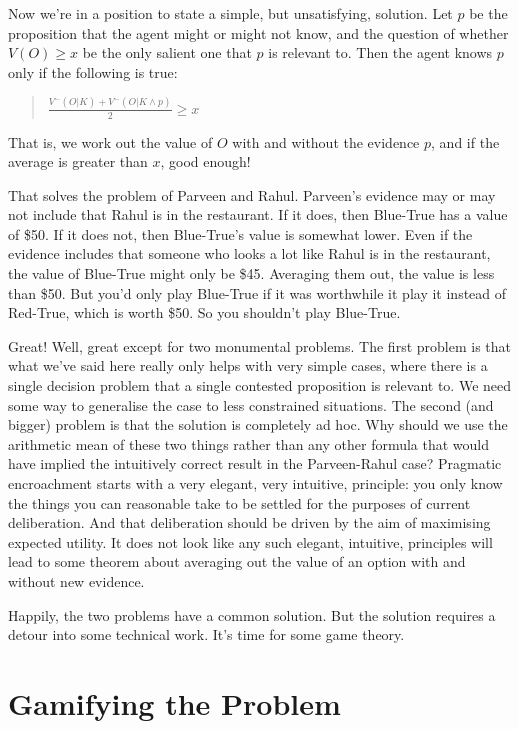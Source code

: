 Now we're in a position to state a simple, but unsatisfying, solution. Let $p$ be the proposition that the agent might or might not know, and the question of whether $V(O) \geq x$ be the only salient one that $p$ is relevant to. Then the agent knows $p$ only if the following is true:

\begin{quote}

$\frac{V^-(O | K) + V^-(O | K \wedge p)}{2} \geq x$
\end{quote}
That is, we work out the value of $O$ with and without the evidence $p$, and if the average is greater than $x$, good enough!

That solves the problem of Parveen and Rahul. Parveen's evidence may or may not include that Rahul is in the restaurant. If it does, then Blue-True has a value of \$50. If it does not, then Blue-True's value is somewhat lower. Even if the evidence includes that someone who looks a lot like Rahul is in the restaurant, the value of Blue-True might only be \$45. Averaging them out, the value is less than \$50. But you'd only play Blue-True if it was worthwhile it play it instead of Red-True, which is worth \$50. So you shouldn't play Blue-True.

Great! Well, great except for two monumental problems. The first problem is that what we've said here really only helps with very simple cases, where there is a single decision problem that a single contested proposition is relevant to. We need some way to generalise the case to less constrained situations. The second (and bigger) problem is that the solution is completely ad hoc. Why should we use the arithmetic mean of these two things rather than any other formula that would have implied the intuitively correct result in the Parveen-Rahul case? Pragmatic encroachment starts with a very elegant, very intuitive, principle: you only know the things you can reasonable take to be settled for the purposes of current deliberation. And that deliberation should be driven by the aim of maximising expected utility. It does not look like any such elegant, intuitive, principles will lead to some theorem about averaging out the value of an option with and without new evidence.

Happily, the two problems have a common solution. But the solution requires a detour into some technical work. It's time for some game theory.

\section{Gamifying the Problem}
\label{gamifyingtheproblem}

